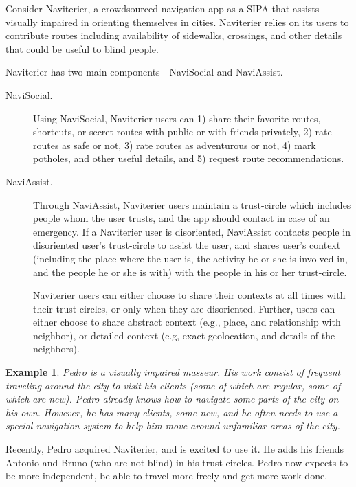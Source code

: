 \documentclass[11pt,          %
               phd,           %
               onehalfspacing %
               ]{ncsuthesis}
\newtheorem{example}{Example}
\newcommand{\navigationapp}{Naviterier\xspace}
\begin{document}
Consider \navigationapp, a crowdsourced navigation app as a SIPA that
assists visually impaired in orienting themselves in cities.
\navigationapp relies on its users to contribute routes including
availability of sidewalks, crossings, and other details that could be
useful to blind people.

\navigationapp has two main components---NaviSocial and NaviAssist. 
\begin{description}
\item[NaviSocial.] Using NaviSocial, \navigationapp users can 1) share
their favorite routes, shortcuts, or secret routes with public or with
friends privately, 2) rate routes as safe or not, 3) rate routes as
adventurous or not, 4) mark potholes, and other useful details, and 5)
request route recommendations.

\item[NaviAssist.] Through NaviAssist, \navigationapp users maintain a
trust-circle which includes people whom the user trusts, and the app
should contact in case of an emergency. If a \navigationapp user is
disoriented, NaviAssist contacts people in disoriented user's
trust-circle to assist the user, and shares user's context (including
the place where the user is, the activity he or she is involved in, and
the people he or she is with) with the people in his or her
trust-circle.

\navigationapp users can either choose to share their contexts at all
times with their trust-circles, or only when they are disoriented.
Further, users can either choose to share abstract context (e.g., place,
and relationship with neighbor), or detailed context (e.g, exact
geolocation, and details of the neighbors).
\end{description}

\begin{example}
Pedro is a visually impaired masseur. His work consist of frequent
traveling around the city to visit his clients (some of which are
regular, some of which are new). Pedro already knows how to navigate
some parts of the city on his own. However, he has many clients, some
new, and he often needs to use a special navigation system to help him
move around unfamiliar areas of the city.
\end{example}

Recently, Pedro acquired \navigationapp, and is excited to use it. He
adds his friends Antonio and Bruno (who are not blind) in his
trust-circles. Pedro now expects to be more independent, be able to
travel more freely and get more work done.
\end{document}
